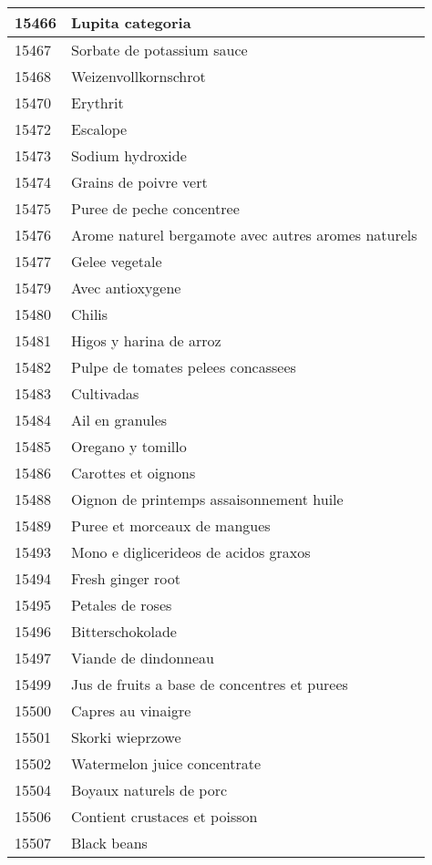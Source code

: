 \begin{longtable}{|l|l|}
15466 & Lupita categoria \\ \hline 
15467 & Sorbate de potassium sauce \\ \hline 
15468 & Weizenvollkornschrot \\ \hline 
15470 & Erythrit \\ \hline 
15472 & Escalope \\ \hline 
15473 & Sodium hydroxide \\ \hline 
15474 & Grains de poivre vert \\ \hline 
15475 & Puree de peche concentree \\ \hline 
15476 & Arome naturel bergamote avec autres aromes naturels \\ \hline 
15477 & Gelee vegetale \\ \hline 
15479 & Avec antioxygene \\ \hline 
15480 & Chilis \\ \hline 
15481 & Higos y harina de arroz \\ \hline 
15482 & Pulpe de tomates pelees concassees \\ \hline 
15483 & Cultivadas \\ \hline 
15484 & Ail en granules \\ \hline 
15485 & Oregano y tomillo \\ \hline 
15486 & Carottes et oignons \\ \hline 
15488 & Oignon de printemps assaisonnement huile \\ \hline 
15489 & Puree et morceaux de mangues \\ \hline 
15493 & Mono e diglicerideos de acidos graxos \\ \hline 
15494 & Fresh ginger root \\ \hline 
15495 & Petales de roses \\ \hline 
15496 & Bitterschokolade \\ \hline 
15497 & Viande de dindonneau \\ \hline 
15499 & Jus de fruits a base de concentres et purees \\ \hline 
15500 & Capres au vinaigre \\ \hline 
15501 & Skorki wieprzowe \\ \hline 
15502 & Watermelon juice concentrate \\ \hline 
15504 & Boyaux naturels de porc \\ \hline 
15506 & Contient crustaces et poisson \\ \hline 
15507 & Black beans \\ \hline 

\end{longtable}

